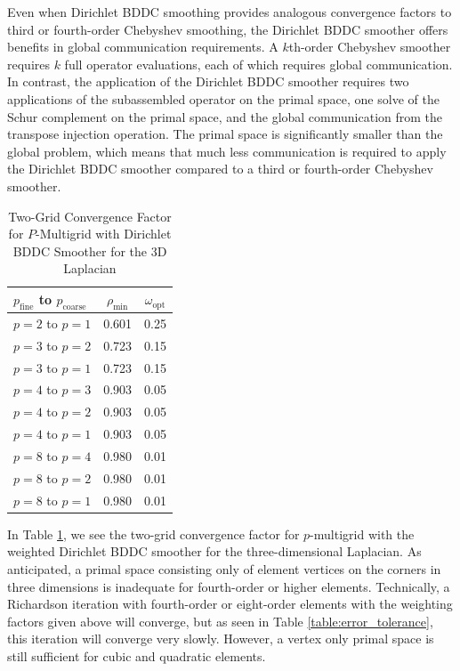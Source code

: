 Even when Dirichlet BDDC smoothing provides analogous convergence factors to third or fourth-order Chebyshev smoothing, the Dirichlet BDDC smoother offers benefits in global communication requirements.
A $k$th-order Chebyshev smoother requires $k$ full operator evaluations, each of which requires global communication.
In contrast, the application of the Dirichlet BDDC smoother requires two applications of the subassembled operator on the primal space, one solve of the Schur complement on the primal space, and the global communication from the transpose injection operation.
The primal space is significantly smaller than the global problem, which means that much less communication is required to apply the Dirichlet BDDC smoother compared to a third or fourth-order Chebyshev smoother.

\begin{table}[ht!]
\begin{center}
\begin{tabular}{l cc}
  \toprule
  $p_{\text{fine}}$ to $p_{\text{coarse}}$  & $\rho_{\min}$ & $\omega_{\text{opt}}$  \\
  \toprule
  $p = 2$ to $p = 1$   &  0.601 & 0.25  \\
  \midrule
  $p = 3$ to $p = 2$   &  0.723 & 0.15  \\
  $p = 3$ to $p = 1$   &  0.723 & 0.15  \\
  \midrule
  $p = 4$ to $p = 3$   &  0.903 & 0.05  \\
  $p = 4$ to $p = 2$   &  0.903 & 0.05  \\
  $p = 4$ to $p = 1$   &  0.903 & 0.05  \\
  \midrule
  $p = 8$ to $p = 4$   &  0.980 & 0.01  \\
  $p = 8$ to $p = 2$   &  0.980 & 0.01  \\
  $p = 8$ to $p = 1$   &  0.980 & 0.01  \\
  \bottomrule
\end{tabular}
\end{center}
\caption{Two-Grid Convergence Factor for $P$-Multigrid with Dirichlet BDDC Smoother for the 3D Laplacian}
\label{table:two_grid_bddc_smoother_3d}
\end{table}

In Table \ref{table:two_grid_bddc_smoother_3d}, we see the two-grid convergence factor for $p$-multigrid with the weighted Dirichlet BDDC smoother for the three-dimensional Laplacian.
As anticipated, a primal space consisting only of element vertices on the corners in three dimensions is inadequate for fourth-order or higher elements.
Technically, a Richardson iteration with fourth-order or eight-order elements with the weighting factors given above will converge, but as seen in Table \ref{table:error_tolerance}, this iteration will converge very slowly.
However, a vertex only primal space is still sufficient for cubic and quadratic elements.

